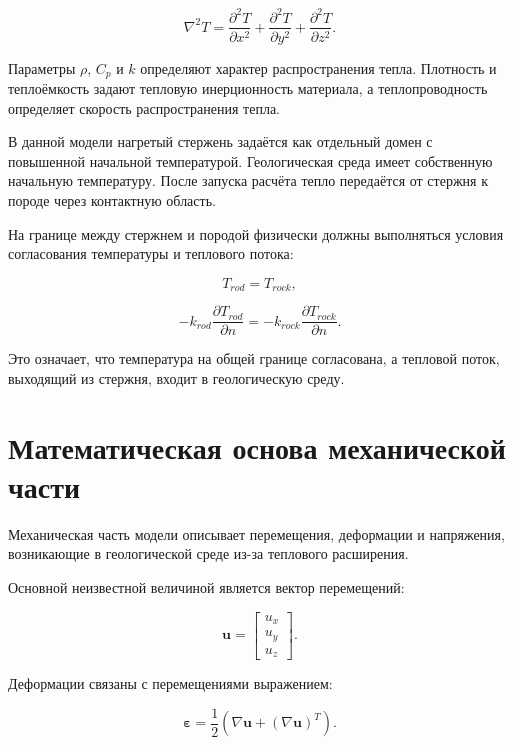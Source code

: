\begin{equation}
\nabla^2T=\frac{\partial^2T}{\partial x^2}+\frac{\partial^2T}{\partial y^2}+\frac{\partial^2T}{\partial z^2}.
\end{equation}

Параметры $\rho$, $C_p$ и $k$ определяют характер распространения тепла. Плотность и теплоёмкость задают тепловую инерционность материала, а теплопроводность определяет скорость распространения тепла.

В данной модели нагретый стержень задаётся как отдельный домен с повышенной начальной температурой. Геологическая среда имеет собственную начальную температуру. После запуска расчёта тепло передаётся от стержня к породе через контактную область.

На границе между стержнем и породой физически должны выполняться условия согласования температуры и теплового потока:

\begin{equation}
T_{rod}=T_{rock},
\end{equation}

\begin{equation}
-k_{rod}\frac{\partial T_{rod}}{\partial n}=-k_{rock}\frac{\partial T_{rock}}{\partial n}.
\end{equation}

Это означает, что температура на общей границе согласована, а тепловой поток, выходящий из стержня, входит в геологическую среду.

\section{Математическая основа механической части}

Механическая часть модели описывает перемещения, деформации и напряжения, возникающие в геологической среде из-за теплового расширения.

Основной неизвестной величиной является вектор перемещений:

\begin{equation}
\mathbf{u}=\begin{bmatrix}u_x\\u_y\\u_z\end{bmatrix}.
\end{equation}

Деформации связаны с перемещениями выражением:

\begin{equation}
\boldsymbol{\varepsilon}=\frac{1}{2}\left(\nabla\mathbf{u}+(\nabla\mathbf{u})^T\right).
\end{equation}

